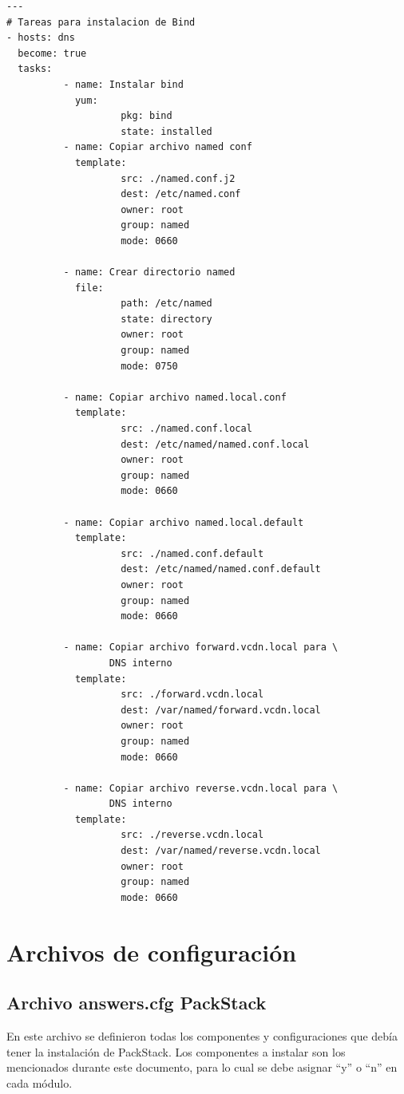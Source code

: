 \documentclass[12pt,a4paper,oneside]{book}
\begin{document}
\begin{lstlisting}[style=codigobase, caption= instalarDNS.yaml]
---
# Tareas para instalacion de Bind
- hosts: dns
  become: true
  tasks:
          - name: Instalar bind
            yum:
                    pkg: bind
                    state: installed
          - name: Copiar archivo named conf
            template:
                    src: ./named.conf.j2
                    dest: /etc/named.conf
                    owner: root
                    group: named
                    mode: 0660

          - name: Crear directorio named
            file:
                    path: /etc/named
                    state: directory
                    owner: root
                    group: named
                    mode: 0750

          - name: Copiar archivo named.local.conf
            template:
                    src: ./named.conf.local
                    dest: /etc/named/named.conf.local
                    owner: root
                    group: named
                    mode: 0660

          - name: Copiar archivo named.local.default
            template:
                    src: ./named.conf.default
                    dest: /etc/named/named.conf.default
                    owner: root
                    group: named
                    mode: 0660

          - name: Copiar archivo forward.vcdn.local para \
                  DNS interno
            template:
                    src: ./forward.vcdn.local
                    dest: /var/named/forward.vcdn.local
                    owner: root
                    group: named
                    mode: 0660

          - name: Copiar archivo reverse.vcdn.local para \
                  DNS interno
            template:
                    src: ./reverse.vcdn.local
                    dest: /var/named/reverse.vcdn.local
                    owner: root
                    group: named
                    mode: 0660
\end{lstlisting}


\chapter{Archivos de configuración}


\section{Archivo answers.cfg PackStack}
\label{seccB.1}
En este archivo se definieron todas los componentes y configuraciones que debía tener la instalación de PackStack. Los componentes a instalar son los mencionados durante este documento, para lo cual se debe asignar ``y'' o ``n''
en cada módulo.
\end{document}
